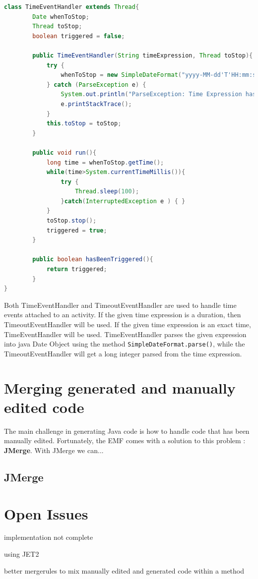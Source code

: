 \begin{lstlisting}[language=Java , caption=TimeEventHandler implementation]
class TimeEventHandler extends Thread{
		Date whenToStop;
		Thread toStop;
		boolean triggered = false;
		
		public TimeEventHandler(String timeExpression, Thread toStop){
			try {
				whenToStop = new SimpleDateFormat("yyyy-MM-dd'T'HH:mm:ss.SSSZ").parse(timeExpression);
			} catch (ParseException e) {
				System.out.println("ParseException: Time Expression has to be in yyyy-MM-dd'T'HH:mm:ss.SSSZ format!");
				e.printStackTrace();
			} 
			this.toStop = toStop;
		}
		
		public void run(){
			long time = whenToStop.getTime();
			while(time>System.currentTimeMillis()){
				try {
					Thread.sleep(100);
				}catch(InterruptedException e ) { }
			}
			toStop.stop();
			triggered = true;
		}
		
		public boolean hasBeenTriggered(){
			return triggered;
		}
}
\end{lstlisting}


Both TimeEventHandler and TimeoutEventHandler are used to handle time events attached to an activity. If the given time expression is a duration, then TimeoutEventHandler will be used. If the given time expression is an exact time, TimeEventHandler will be used. TimeEventHandler parses the given expression into java Date Object using the method \verb|SimpleDateFormat.parse()|, while the TimeoutEventHandler will get a long integer parsed from the time expression. 


\section{Merging generated and manually edited code}
The main challenge in generating Java code is how to handle code that has been manually edited. Fortunately, the EMF comes with a solution to this problem : \textbf{JMerge}\cite{JMERGEFAQ}. With JMerge we can...

\subsection{JMerge}
\section{Open Issues}
implementation not complete


using JET2


better mergerules to mix manually edited and generated code within a method



